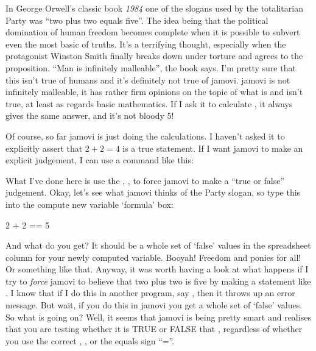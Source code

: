 In George Orwell's classic book {\it 1984} one of the slogans used by the totalitarian Party was ``two plus two equals five''. The idea being that the political domination of human freedom becomes complete when it is possible to subvert even the most basic of truths. It's a terrifying thought, especially when the protagonist Winston Smith finally breaks down under torture and agrees to the proposition. ``Man is infinitely malleable'', the book says. I'm pretty sure that this isn't true of humans and it's definitely not true of jamovi. jamovi is not infinitely malleable, it has rather firm opinions on the topic of what is and isn't true, at least as regards basic mathematics. If I ask it to calculate , it always gives the same answer, and it's not bloody 5!

Of course, so far jamovi is just doing the calculations. I haven't asked it to explicitly assert that $2+2 = 4$ is a true statement. If I want jamovi to make an explicit judgement, I can use a command like this: 

What I've done here is use the , \rtext{==}, to force jamovi to make a ``true or false'' judgement. Okay, let's see what jamovi thinks of the Party slogan, so type this into the compute new variable `formula' box: 

\begin{rblock1}
2 + 2 == 5
\end{rblock1}

\noindent
And what do you get? It should be a whole set of `false' values in the spreadsheet column for your newly computed variable. Booyah! Freedom and ponies for all! Or something like that. Anyway, it was worth having a look at what happens if I try to {\it force} jamovi to believe that two plus two is five by making a statement like . I know that if I do this in another program, say \R, then it throws up an error message. But wait, if you do this in jamovi you get a whole set of `false' values. So what is going on? Well, it seems that jamovi is being pretty smart and realises that you are testing whether it is TRUE or FALSE that , regardless of whether you use the correct , \rtext{==}, or the equals sign ``=''. 


